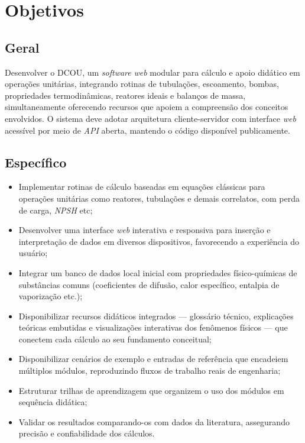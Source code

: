 \chapter{Objetivos}

\section{Geral}

Desenvolver o DCOU, um \textit{software} \textit{web} modular para cálculo e apoio didático em operações unitárias, integrando rotinas de tubulações, escoamento, bombas, propriedades termodinâmicas, reatores ideais e balanços de massa, simultaneamente oferecendo recursos que apoiem a compreensão dos conceitos envolvidos. O sistema deve adotar arquitetura cliente-servidor com interface \textit{web} acessível por meio de \textit{API} aberta, mantendo o código disponível publicamente.

\section{Específico}

\begin{itemize}
    \item Implementar rotinas de cálculo baseadas em equações clássicas para operações unitárias como reatores, tubulações e demais correlatos, com perda de carga, \textit{NPSH} etc;
    \item Desenvolver uma interface \textit{web} interativa e responsiva para inserção e interpretação de dados em diversos dispositivos, favorecendo a experiência do usuário;
    \item Integrar um banco de dados local inicial com propriedades físico-químicas de substâncias comuns (coeficientes de difusão, calor específico, entalpia de vaporização etc.);
    \item Disponibilizar recursos didáticos integrados --- glossário técnico, explicações teóricas embutidas e visualizações interativas dos fenômenos físicos --- que conectem cada cálculo ao seu fundamento conceitual;
    \item Disponibilizar cenários de exemplo e entradas de referência que encadeiem múltiplos módulos, reproduzindo fluxos de trabalho reais de engenharia;
    \item Estruturar trilhas de aprendizagem que organizem o uso dos módulos em sequência didática;
    \item Validar os resultados comparando-os com dados da literatura, assegurando precisão e confiabilidade dos cálculos.
\end{itemize}
